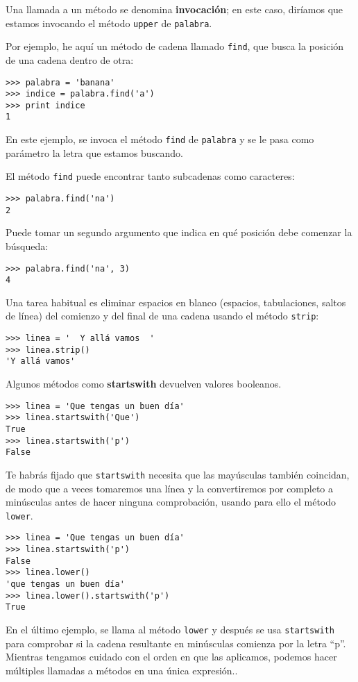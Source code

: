
Una llamada a un método se denomina {\bf invocación}; en este caso, diríamos
que estamos invocando el método {\tt upper} de {\tt palabra}.


Por ejemplo, he aquí un método de cadena llamado {\tt find}, que
busca la posición de una cadena dentro de otra:

\beforeverb
\begin{verbatim}
>>> palabra = 'banana'
>>> indice = palabra.find('a')
>>> print indice
1
\end{verbatim}
\afterverb
%
En este ejemplo, se invoca el método {\tt find} de {\tt palabra} y se le
pasa como parámetro la letra que estamos buscando.

El método {\tt find} puede encontrar tanto subcadenas como caracteres:

\beforeverb
\begin{verbatim}
>>> palabra.find('na')
2
\end{verbatim}
\afterverb
%
Puede tomar un segundo argumento que indica en qué posición debe comenzar la búsqueda:


\beforeverb
\begin{verbatim}
>>> palabra.find('na', 3)
4
\end{verbatim}
\afterverb
%
Una tarea habitual es eliminar espacios en blanco (espacios, tabulaciones, saltos de línea)
del comienzo y del final de una cadena usando el método {\tt strip}:

\beforeverb
\begin{verbatim}
>>> linea = '  Y allá vamos  '
>>> linea.strip()
'Y allá vamos'
\end{verbatim}
\afterverb
%
Algunos métodos como {\bf startswith} devuelven valores booleanos.

\beforeverb
\begin{verbatim}
>>> linea = 'Que tengas un buen día'
>>> linea.startswith('Que')
True
>>> linea.startswith('p')
False
\end{verbatim}
\afterverb
%
Te habrás fijado que {\tt startswith} necesita que las mayúsculas también coincidan, de modo
que a veces tomaremos una línea y la convertiremos por completo a minúsculas antes de hacer
ninguna comprobación, usando para ello el método {\tt lower}.

\beforeverb
\begin{verbatim}
>>> linea = 'Que tengas un buen día'
>>> linea.startswith('p')
False
>>> linea.lower()
'que tengas un buen día'
>>> linea.lower().startswith('p')
True
\end{verbatim}
\afterverb
%
En el último ejemplo, se llama al método {\tt lower}
y después se usa {\tt startswith} para comprobar
si la cadena resultante en minúsculas
comienza por la letra ``p''. Mientras tengamos cuidado
con el orden en que las aplicamos, podemos hacer múltiples
llamadas a métodos en una única expresión..

